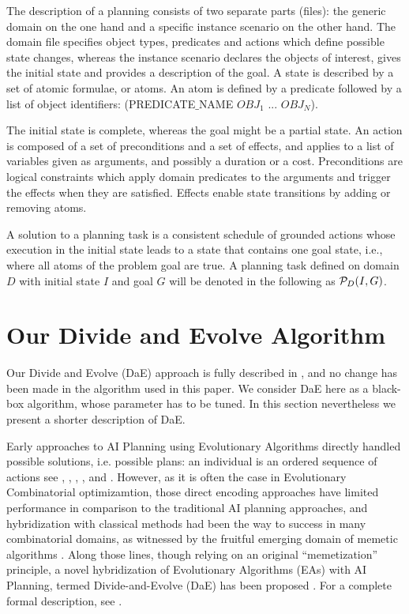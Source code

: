 \documentclass{article}
\begin{document}
The description of a planning consists of two separate parts (files): the generic domain on the one hand and a specific instance scenario on the other hand. The domain file specifies object types, predicates and actions which define possible state changes, whereas the instance scenario declares the objects of interest, gives the initial state and provides a description of the goal. A state is described by a set of atomic formulae, or atoms. An atom is defined by a predicate followed by a list of object identifiers: (PREDICATE$\_$NAME $OBJ_1$ ... $OBJ_N$). 

The initial state is complete, whereas the goal might be a partial state. An action is composed of a set of preconditions and a set of effects, and applies to a list of variables given as arguments, and possibly a duration or a cost. Preconditions are logical constraints which apply domain predicates to the arguments and trigger the effects when they are satisfied. Effects enable state transitions by adding or removing atoms.

A solution to a planning task is a consistent schedule of grounded actions whose execution in the initial state leads to a state that contains one goal state, i.e., where all atoms of the problem goal are true. A planning task defined on domain $D$ with initial state $I$ and goal $G$ will be denoted in the following as ${\cal P}_D(I,G)$.

\section{Our Divide and Evolve Algorithm}
\label{section:dae}

Our Divide and Evolve (DaE) approach is fully described in \cite{BibEvoCop:2010}, and no change has been made in the algorithm used in this paper. We consider DaE here as a black-box algorithm, whose parameter has to be tuned. In this section nevertheless we present a shorter description of DaE.

Early approaches to AI Planning using Evolutionary Algorithms directly handled possible solutions, i.e. possible plans: an individual is an ordered sequence of actions see \cite{Spector-AAAI-94}, \cite{muslea97}, \cite{westerberg:2000}, \cite{westerberg:2001}, and \cite{Morignot-2005}. However, as it is often the case in Evolutionary Combinatorial optimizamtion, those direct encoding approaches have limited performance in comparison to the traditional AI planning approaches, and hybridization with classical methods had been the way to success in many combinatorial domains, as witnessed by the fruitful emerging domain of memetic algorithms \cite{MemeticBook:2005}. Along those lines, though relying on an original ``memetization'' principle, a novel hybridization of Evolutionary Algorithms (EAs) with AI Planning, termed Divide-and-Evolve (DaE) has been proposed \cite{DAE:EvoCOP06} \cite{DAE:book-2007}. For a complete formal description, see \cite{Bibai:ICAPS2010}.
\end{document}
